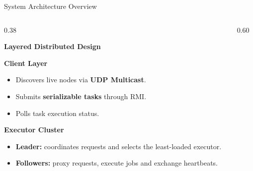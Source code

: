 \documentclass[aspectratio=169, 10pt]{beamer}
\begin{document}
\begin{frame}{System Architecture Overview}

\begin{columns}[T]

\begin{column}{0.38\textwidth}

\small

\textbf{Layered Distributed Design}

\vspace{0.3cm}

\textcolor{PolimiBlue}{\textbf{Client Layer}}

\begin{itemize}
    \setlength{\itemsep}{0.2em}
    \item Discovers live nodes via \textbf{UDP Multicast}.
    \item Submits \textbf{serializable tasks} through RMI.
    \item Polls task execution status.
\end{itemize}

\vspace{0.2cm}

\textcolor{PolimiBlue}{\textbf{Executor Cluster}}

\begin{itemize}
    \setlength{\itemsep}{0.2em}
    \item \textcolor{AccentOrange}{\textbf{Leader:}}
    coordinates requests and selects the least-loaded executor.

    \item \textbf{Followers:}
    proxy requests, execute jobs and exchange heartbeats.
\end{itemize}

\end{column}


\begin{column}{0.60\textwidth}

\centering


\end{column}
\end{columns}
\end{frame}
\end{document}
